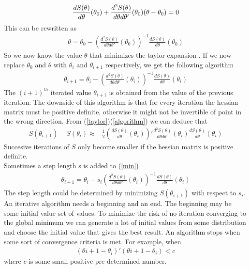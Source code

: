 \documentclass{article}
\begin{document}
\begin{eqnarray}
\frac{dS(\theta)}{d\theta}(\theta_0) + \frac{d^2 S(\theta)}{d\theta d\theta'}(\theta_0)(\theta - \theta_0) = 0 \notag
\end{eqnarray}
This can be rewritten as
\begin{eqnarray}
\theta = \theta_0 - (\frac{d^2 S(\theta)}{d\theta d\theta'}(\theta_0))^{-1} \frac{dS(\theta)}{d\theta}(\theta_0)
\end{eqnarray}
So we now know the value $\theta$ that minimizes the taylor expansion . If we now replace $\theta_0$ and $\theta$ with $\theta_i$ and $\theta_{i+1}$ respectively, we get the following algorithm
\begin{eqnarray}
\theta_{i+1} = \theta_i - (\frac{d^2 S(\theta)}{d\theta d\theta'}(\theta_i))^{-1} \frac{dS(\theta)}{d\theta}(\theta_i) \label{algorithm}
\end{eqnarray}
The $(i+1)^{th}$ iterated value $\theta_{i+1}$ is obtained from the value of the previous iteration. 
The downside of this algorithm is that for every iteration the hessian matrix must be positive definite, otherwise it might not be invertible of point in the wrong direction. From (\ref{taylor})(\ref{algorithm}) we can deduce that 
\begin{eqnarray}
S(\theta_{i+1}) - S(\theta_i)\approx   -\frac{1}{2}  (\frac{dS(\theta)}{d\theta}(\theta_i))'  \frac{d^2 S(\theta)}{d\theta d\theta'}(\theta_i)\frac{dS(\theta)}{d\theta}(\theta_i)
\end{eqnarray}
Succesive iterations of $S$ only become smaller if the hessian matrix is positive definite.\\
Sometimes a step length s is added to (\ref{min})
\begin{eqnarray}
\theta_{i+1} = \theta_i - s_i(\frac{d^2 S(\theta)}{d\theta d\theta'}(\theta_i))^{-1} \frac{dS(\theta)}{d\theta}(\theta_i)
\end{eqnarray}
The step length could be determined by minimizing $S(\theta_{i+1})$ with respect to $s_i$. 
\\
An iterative algorithm needs a beginning and an end. The beginning may be some initial value set of values. To minimize the risk of no iteration converging to the global minimum we can generate a lot of  initial values from some distribution and choose the initial value that gives the best result. An algorithm stops when some sort of convergence criteria is met. For example, when 
\begin{eqnarray}
(\theta{i+1} - \theta_i)'(\theta{i+1} - \theta_i) < c
\end{eqnarray}
where $c$ is some small positive pre-determined number. 
\end{document}
